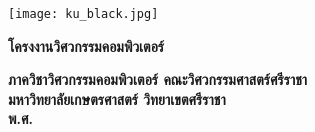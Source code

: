 \begin{center}
\texttt{[image: ku\_black.jpg]}

{\fontsize{35pt}{37pt}\selectfont\bfseries โครงงานวิศวกรรมคอมพิวเตอร์}

\vspace{0.3in}
{\fontsize{20pt}{22pt}\selectfont\bfseries%

}
\vfill
{\fontsize{20pt}{22pt}\selectfont\bfseries
}
\vfill
{\fontsize{20pt}{22pt}\selectfont\bfseries ภาควิชาวิศวกรรมคอมพิวเตอร์ คณะวิศวกรรมศาสตร์ศรีราชา\\
มหาวิทยาลัยเกษตรศาสตร์ วิทยาเขตศรีราชา\\
พ.ศ. \thisYear}\\
\end{center}
